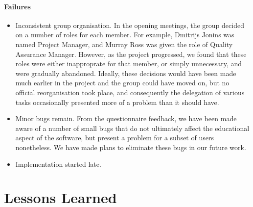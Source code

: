 \paragraph{Failures}
\begin{itemize}
\item Inconsistent group organisation. In the opening meetings, the group decided on
  a number of roles for each member. For example, Dmitrijs Jonins was named Project 
  Manager, and Murray Ross was given the role of Quality Assurance Manager. However,
  as the project progressed, we found that these roles were either inapproprate for
  that member, or simply unnecessary, and were gradually abandoned. Ideally, these
  decisions would have been made much earlier in the project and the group could have
  moved on, but no official reorganisation took place, and consequently the delegation
  of various tasks occasionally presented more of a problem than it should have.  

\item Minor bugs remain. From the questionnaire feedback, we have been made aware of
  a number of small bugs that do not ultimately affect the educational aspect of the
  software, but present a problem for a subset of users nonetheless. We have made plans
  to eliminate these bugs in our future work. 

\item Implementation started late. 

\end{itemize}

\section{Lessons Learned}
